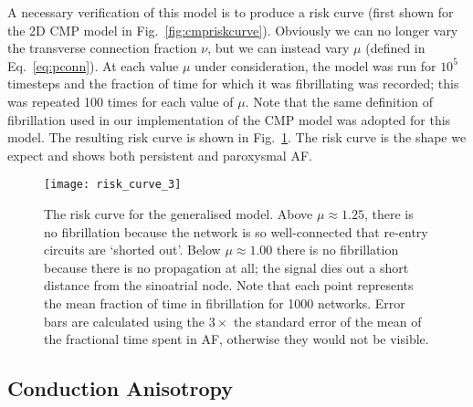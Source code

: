 A necessary verification of this model is to produce a risk curve (first shown for the 2D CMP model in Fig.~\ref{fig:cmpriskcurve}). Obviously we can no longer vary the transverse connection fraction $\nu$, but we can instead vary $\mu$ (defined in Eq.~\eqref{eq:pconn}). At each value $\mu$ under consideration, the model was run for $10^5$ timesteps and the fraction of time for which it was fibrillating was recorded; this was repeated 100 times for each value of $\mu$. Note that the same definition of fibrillation used in our implementation of the CMP model was adopted for this model. The resulting risk curve is shown in Fig.~\ref{fig:ourriskcurve}. The risk curve is the shape we expect and shows both persistent and paroxysmal AF.
\begin{figure}[h] \begin{mdframed}
    \centering
    \texttt{[image: risk\_curve\_3]}
    \caption{The risk curve for the generalised model. Above $\mu \approx 1.25$, there is no fibrillation because the network is so well-connected that re-entry circuits are `shorted out'. Below $\mu \approx 1.00$ there is no fibrillation because there is no propagation at all; the signal dies out a short distance from the sinoatrial node. Note that each point represents the mean fraction of time in fibrillation for 1000 networks. Error bars are calculated using the $3 \times$ the standard error of the mean of the fractional time spent in AF, otherwise they would not be visible.}
    \label{fig:ourriskcurve}
\end{mdframed} \end{figure}

\clearpage

\subsection{Conduction Anisotropy}

